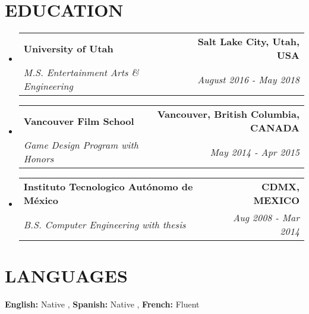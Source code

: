 \documentclass[letterpaper,11pt]{article}
\makeatletter
\newcommand{\resumeSubheading}[4]{
  \vspace{-2pt}\item
    \begin{tabular*}{1.0\textwidth}[t]{l@{\extracolsep{\fill}}r}
      \textbf{\large#1} & \textbf{\small #2} \\
      \textit{\large#3} & \textit{\small #4} \\
      
    \end{tabular*}\vspace{-7pt}
}
\newcommand{\resumeSubHeadingListStart}{\begin{itemize}[leftmargin=0.0in, label={}]}
\newcommand{\resumeSubHeadingListEnd}{\end{itemize}}
\makeatother
\begin{document}
\section{\color{airforceblue}EDUCATION}
\begin{adjustwidth}{.25in}{0in} %
\resumeSubHeadingListStart
  \resumeSubheading
    {University of Utah}{Salt Lake City, Utah, USA}
    {M.S. Entertainment Arts \& Engineering}{August 2016 - May 2018}
  \vspace{-4pt}
   \resumeSubheading
    {Vancouver Film School}{Vancouver, British Columbia, CANADA}
    {Game Design Program with Honors}{May 2014 - Apr 2015}
  \vspace{-4pt}
   \resumeSubheading
    {Instituto Tecnologico Autónomo de México}{CDMX, MEXICO}
    {B.S. Computer Engineering with thesis}{Aug 2008 - Mar 2014}
\resumeSubHeadingListEnd
\end{adjustwidth}
\vspace{-4pt}

\section{\color{airforceblue}LANGUAGES}
\begin{itemize}[leftmargin=0.25in, label={}]
  \small{\item{
   \textbf{\normalsize{English:}}{ \normalsize{Native}} ,
   \textbf{\normalsize{Spanish:}}{ \normalsize{Native}} ,
    \textbf{\normalsize{French:}}{ \normalsize{Fluent}}
   }}
\end{itemize}
\end{document}
